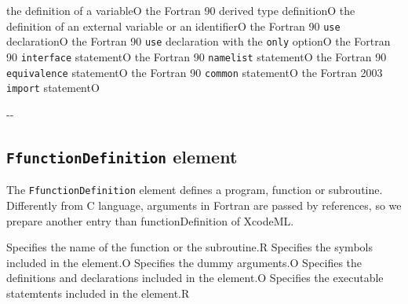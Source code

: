 \begin{XcodeMLChildElements}
{the definition of a variable}{O}
{the Fortran 90 derived type definition}{O}
{the definition of an external variable or an identifier}{O}
{the Fortran 90 {\tt use} declaration}{O}
{the Fortran 90 {\tt use} declaration with the {\tt only} option}{O}
{the Fortran 90 {\tt interface} statement}{O}
{the Fortran 90 {\tt namelist} statement}{O}
{the Fortran 90 {\tt equivalence} statement}{O}
{the Fortran 90 {\tt common} statement}{O}
{the Fortran 2003 {\tt import}  statement}{O}
\end{XcodeMLChildElements}

\begin{XcodeMLAttributes}
\XcodeMLAttrDef{-}{-}
{-}{-}
\end{XcodeMLAttributes}


\subsection{ {\tt FfunctionDefinition} element}

The {\tt FfunctionDefinition} element defines a program, function or subroutine.
Differently from C language, arguments in Fortran are passed by references, so we prepare another entry than functionDefinition of XcodeML.


\begin{XcodeMLChildElements}
{Specifies the name of  the function or  the subroutine.}{R}
{Specifies the symbols included in the element.}{O}
{Specifies the dummy arguments.}{O}
{Specifies the definitions and declarations included in the element.}{O}
{Specifies the executable statemtents included in the element.}{R}
\end{XcodeMLChildElements}

